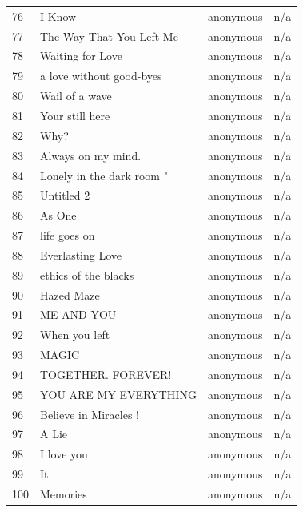 \documentclass{book}
\begin{document}
\begin{table}
\begin{tabular}{llll}
76 & I Know & anonymous & n/a \\
77 & The Way That You Left Me & anonymous & n/a \\
78 & Waiting for Love & anonymous & n/a \\
79 & a love without good-byes & anonymous & n/a \\
80 & Wail of a wave & anonymous & n/a \\
81 & Your still here & anonymous & n/a \\
82 & Why? & anonymous & n/a \\
83 & Always on my mind. & anonymous & n/a \\
84 & Lonely in the dark room " & anonymous & n/a \\
85 & Untitled 2 & anonymous & n/a \\
86 & As One & anonymous & n/a \\
87 & life goes on & anonymous & n/a \\
88 & Everlasting Love & anonymous & n/a \\
89 & ethics of the blacks & anonymous & n/a \\
90 & Hazed Maze & anonymous & n/a \\
91 & ME AND YOU & anonymous & n/a \\
92 & When you left & anonymous & n/a \\
93 & MAGIC & anonymous & n/a \\
94 & TOGETHER. FOREVER! & anonymous & n/a \\
95 & YOU ARE MY EVERYTHING & anonymous & n/a \\
96 & Believe in Miracles ! & anonymous & n/a \\
97 & A Lie & anonymous & n/a \\
98 & I love you & anonymous & n/a \\
99 & It & anonymous & n/a \\
100 & Memories & anonymous & n/a \\
\bottomrule
\end{tabular}
\end{table}
\end{document}
